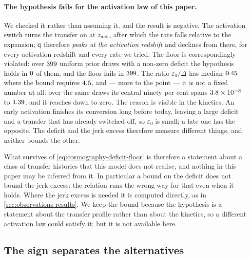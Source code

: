 \paragraph{The hypothesis fails for the activation law of this paper.} We
checked it rather than assuming it, and the result is negative. The activation
switch turns the transfer on at $z_{\mathrm{act}}$, after which the rate falls relative to
the expansion; $\mathsf q$ therefore \emph{peaks at the activation redshift} and
declines from there, for every activation redshift and every rate we tried. The
floor is correspondingly violated: over
$399$ uniform prior draws with a non-zero
deficit the hypothesis holds in $0$ of
them, and the floor fails in
$399$. The ratio $\varepsilon_0/\Delta$ has
median $0.45$ where the bound requires
$4.5$, and --- more to the point --- it is
not a fixed number at all: over the same draws its central ninety per cent
spans $\num{3.8e-08}$ to $1.39$, and
it reaches down to zero. The reason
is visible in the kinetics. An early activation finishes its conversion long
before today, leaving a large deficit and a transfer that has already switched
off, so $\varepsilon_0$ is small; a late one has the opposite. The deficit and
the jerk excess therefore measure different things, and neither bounds the
other.

What survives of \cref{eq:cosmography-deficit-floor} is therefore a statement
about a class of transfer histories that this model does not realise, and
nothing in this paper may be inferred from it. In particular a bound on the deficit does
not bound the jerk excess: the relation runs the wrong way for that even when
it holds. Where the jerk excess is needed it is computed directly, as in
\cref{sec:observations-results}. We keep the bound because the hypothesis is a
statement about the transfer profile rather than about the kinetics, so a
different activation law could satisfy it; but it is not available here.

\subsection{The sign separates the alternatives}\label{sec:cosmography-signs}

